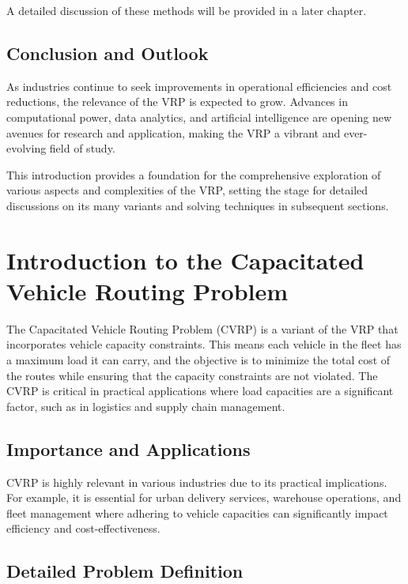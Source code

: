 \documentclass[
]{article}
\begin{document}
    A detailed discussion of these methods will be provided in a later chapter.

    \subsection{Conclusion and Outlook}\label{subsec:conclusion-and-outlook}
    As industries continue to seek improvements in operational efficiencies and cost reductions, the relevance of the VRP is expected to grow. Advances in computational power, data analytics, and artificial intelligence are opening new avenues for research and application, making the VRP a vibrant and ever-evolving field of study.

    This introduction provides a foundation for the comprehensive exploration of various aspects and complexities of the VRP, setting the stage for detailed discussions on its many variants and solving techniques in subsequent sections.
    \newpage


    \section{Introduction to the Capacitated Vehicle Routing Problem}\label{sec:intro_cvrp}

    The Capacitated Vehicle Routing Problem (CVRP) is a variant of the VRP that incorporates vehicle capacity constraints. This means each vehicle in the fleet has a maximum load it can carry, and the objective is to minimize the total cost of the routes while ensuring that the capacity constraints are not violated. The CVRP is critical in practical applications where load capacities are a significant factor, such as in logistics and supply chain management.

    \subsection{Importance and Applications}\label{subsec:importance-and-applications}

    CVRP is highly relevant in various industries due to its practical implications. For example, it is essential for urban delivery services, warehouse operations, and fleet management where adhering to vehicle capacities can significantly impact efficiency and cost-effectiveness.

    \subsection{Detailed Problem Definition}\label{subsec:detailed-problem-definition}
\end{document}
